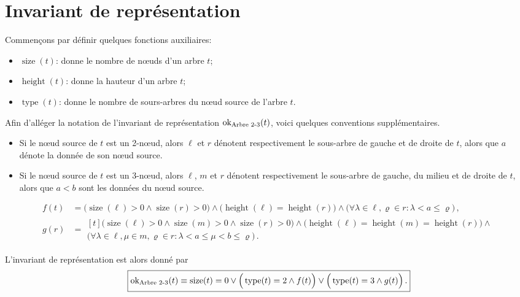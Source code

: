 \documentclass{elsarticle}
\newcommand{\ok}{\ensuremath{\textnormal{ok}_{\textnormal{Arbre 2-3}}}}
\DeclareMathOperator{\size}{size}
\DeclareMathOperator{\height}{height}
\DeclareMathOperator{\type}{type}
\renewcommand{\rho}{\varrho}
\begin{document}
\section{Invariant de représentation}
Commençons par définir quelques fonctions auxiliaires:
\begin{itemize}
	\item \(\size(t)\): donne le nombre de n\oe{}uds d'un arbre \(t\);
	\item \(\height(t)\): donne la hauteur d'un arbre \(t\);
	\item \(\type(t)\): donne le nombre de sours-arbres du n\oe{}ud source de l'arbre \(t\).
\end{itemize}
Afin d'alléger la notation de l'invariant de représentation \(\ok(t)\), voici quelques conventions supplémentaires.
\begin{itemize}
	\item Si le n\oe{}ud source de \(t\) est un 2-n\oe{}ud, alors \(\ell\) et \(r\) dénotent respectivement le sous-arbre de gauche et de droite de \(t\), alors que \(a\) dénote la donnée de son n\oe{}ud source.
	\item Si le n\oe{}ud source de \(t\) est un 3-n\oe{}ud, alors \(\ell\), \(m\) et \(r\) dénotent respectivement le sous-arbre de gauche, du milieu et de droite de \(t\), alors que \(a < b\) sont les données du n\oe{}ud source.
\end{itemize}
\begin{align}
f(t) &= \Big(\size(\ell) > 0 \land \size(r) > 0\Big) \land \Big(\height(\ell) = \height(r)\Big) \land \Big(\forall \lambda \in \ell, \rho \in r : \lambda < a \le \rho \Big)\,,\\
g(r) &= \begin{multlined}[t] \Big(\size(\ell) > 0 \land \size(m) > 0 \land \size(r) > 0\Big) \land \Big(\height(\ell) = \height(m) = \height(r)\Big) \land {}\\ \Big(\forall \lambda \in \ell, \mu \in m, \rho \in r : \lambda < a \le \mu < b \le \rho \Big)\,.
\end{multlined}
\end{align}

L'invariant de représentation est alors donné par
\begin{equation}
\boxed{\ok(t) \equiv \size(t) = 0 \lor \Big(\type(t) = 2 \land f(t)\Big) \lor  \Big(\type(t) = 3 \land g(t)\Big)\,.}
\end{equation}
\end{document}
